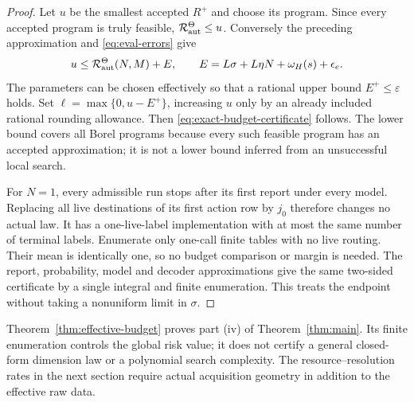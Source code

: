 \begin{proof}
Let $u$ be the smallest accepted $R^+$ and choose its program. Since every accepted program is truly feasible, $\mathcal R_{\mathrm{aut}}^\Theta\le u$. Conversely the preceding approximation and \eqref{eq:eval-errors} give
\[
 u\le\mathcal R_{\mathrm{aut}}^\Theta(N,M)+E,
 \qquad E=L\sigma+L\eta N+\omega_H(s)+\epsilon_e.
\]
The parameters can be chosen effectively so that a rational upper bound $E^+\le\varepsilon$ holds. Set $\ell=\max\{0,u-E^+\}$, increasing $u$ only by an already included rational rounding allowance. Then \eqref{eq:exact-budget-certificate} follows. The lower bound covers all Borel programs because every such feasible program has an accepted approximation; it is not a lower bound inferred from an unsuccessful local search.

For $N=1$, every admissible run stops after its first report under every model. Replacing all live destinations of its first action row by $j_0$ therefore changes no actual law. It has a one-live-label implementation with at most the same number of terminal labels. Enumerate only one-call finite tables with no live routing. Their mean is identically one, so no budget comparison or margin is needed. The report, probability, model and decoder approximations give the same two-sided certificate by a single integral and finite enumeration. This treats the endpoint without taking a nonuniform limit in $\sigma$.
\end{proof}

Theorem~\ref{thm:effective-budget} proves part (iv) of Theorem~\ref{thm:main}. Its finite enumeration controls the global risk value; it does not certify a general closed-form dimension law or a polynomial search complexity. The resource--resolution rates in the next section require actual acquisition geometry in addition to the effective raw data.
